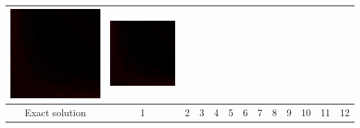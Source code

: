 \begin{landscape}
\begin{table}[b]
\begin{tabular}{ccccccccccccc}
 \includegraphics[scale=0.04]{chapter5/figures/wrong_matrix_viewpoint_mult-diff-2.png}&
 \includegraphics[scale=0.04]{chapter5/figures/wrong_loop_range-diff-2.png}\\
\hline
Exact solution & 1 & 2 & 3 & 4 & 5 & 6 & 7 & 8 & 9 & 10 & 11 & 12\\
\end{tabular}
\end{table}
\end{landscape}

